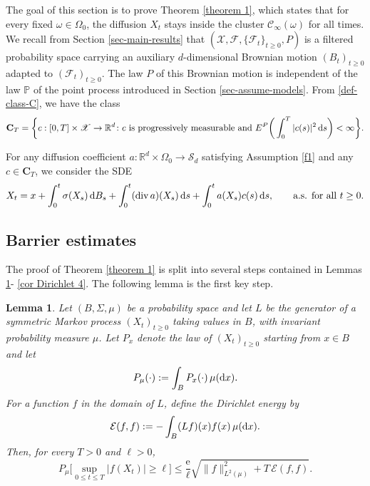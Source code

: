 \documentclass[11pt]{article}
\renewcommand{\d}{{\rm d}}
\newcommand{\e}{\mathrm e}
\newcommand{\R}{\mathbb R}
\renewcommand{\P}{\mathbb P}
\newtheorem{lemma}[theorem]{Lemma}
\theoremstyle{rem}
\begin{document}
The goal of this section is to prove Theorem \ref{theorem 1}, which states that for every fixed $\omega\in\Omega_0$, the diffusion $X_t$ stays inside the cluster $\mathcal C_\infty(\omega)$ for all times. We recall from Section \ref{sec-main-results} that $(\mathscr{X},\mathcal{F},\{\mathcal F_t\}_{t\geq 0},P)$ is a filtered probability space carrying an auxiliary $d$-dimensional Brownian motion $(B_t)_{t\geq 0}$ adapted to $(\mathcal F_t)_{t\geq 0}$. The law $P$ of this Brownian motion is independent of the law $\P$ of the point process introduced in Section \ref{sec-assume-models}. From \eqref{def-class-C}, we have the class
\[
\mathbf C_T
=
\bigg\{
c:[0,T]\times \mathscr X \to \R^d
\colon
c \mbox{ is progressively measurable and }
E^P\bigg(\int_0^T |c(s)|^2\,\d s\bigg)<\infty
\bigg\}.
\]

For any diffusion coefficient $a:\R^d\times\Omega_0\to\mathcal S_d$ satisfying Assumption \ref{f1} and any $c\in\mathbf C_T$, we consider the SDE
\begin{equation}\label{controlled-sde}
X_t
=
x
+
\int_0^t \sigma(X_s)\,\d B_s
+
\int_0^t(\mathrm{div}\,a)(X_s)\,\d s
+
\int_0^t a(X_s)c(s)\,\d s,
\qquad
\mbox{a.s. for all } t\geq0.
\end{equation}

\subsection{Barrier estimates}\label{subsec barrier}

The proof of Theorem \ref{theorem 1} is split into several steps contained in Lemmas \ref{lemma Dirichlet}-  \ref{cor Dirichlet 4}. The following lemma is the first key step.

\begin{lemma}\label{lemma Dirichlet}
Let $(B,\Sigma,\mu)$ be a probability space and let $L$ be the generator of a symmetric Markov process $(X_t)_{t\geq0}$ taking values in $B$, with invariant probability measure $\mu$. Let $P_x$ denote the law of $(X_t)_{t\geq0}$ starting from $x\in B$ and let
\[
P_\mu(\cdot):=\int_B P_x(\cdot)\,\mu(\d x).
\]
For a function $f$ in the domain of $L$, define the Dirichlet energy by
\[
\mathcal E(f,f):=-\int_B (Lf)(x)f(x)\,\mu(\d x).
\]
Then, for every $T>0$ and $\ell>0$,
\begin{equation}\label{est lemma Dirichlet}
P_\mu\bigg[\sup_{0\leq t\leq T}|f(X_t)|\geq \ell\bigg]
\leq
\frac{\e}{\ell}
\sqrt{\|f\|_{L^2(\mu)}^2+T\,\mathcal E(f,f)}.
\end{equation}

\end{lemma}
\end{document}
